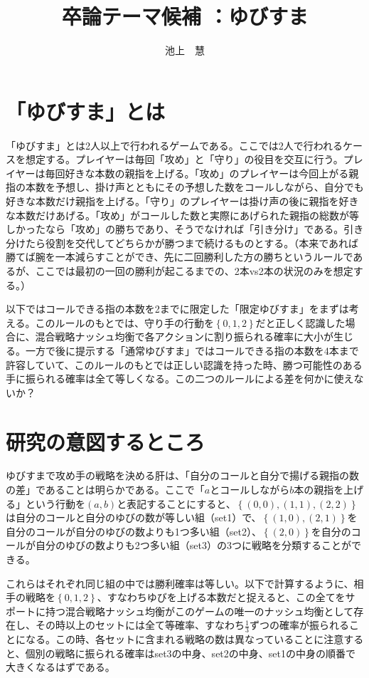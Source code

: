 \documentclass{jsarticle}
\begin{document}
\title{卒論テーマ候補 ：ゆびすま}
\author{池上　慧}
\maketitle

\section{「ゆびすま」とは}
「ゆびすま」とは2人以上で行われるゲームである。ここでは2人で行われるケースを想定する。プレイヤーは毎回「攻め」と「守り」の役目を交互に行う。プレイヤーは毎回好きな本数の親指を上げる。「攻め」のプレイヤーは今回上がる親指の本数を予想し、掛け声とともにその予想した数をコールしながら、自分でも好きな本数だけ親指を上げる。「守り」のプレイヤーは掛け声の後に親指を好きな本数だけあげる。「攻め」がコールした数と実際にあげられた親指の総数が等しかったなら「攻め」の勝ちであり、そうでなければ「引き分け」である。引き分けたら役割を交代してどちらかが勝つまで続けるものとする。（本来であれば勝てば腕を一本減らすことができ、先に二回勝利した方の勝ちというルールであるが、ここでは最初の一回の勝利が起こるまでの、2本vs2本の状況のみを想定する。）

以下ではコールできる指の本数を2までに限定した「限定ゆびすま」をまずは考える。このルールのもとでは、守り手の行動を$\left\{ 0,1,2 \right\}$だと正しく認識した場合に、混合戦略ナッシュ均衡で各アクションに割り振られる確率に大小が生じる。一方で後に提示する「通常ゆびすま」ではコールできる指の本数を4本まで許容していて、このルールのもとでは正しい認識を持った時、勝つ可能性のある手に振られる確率は全て等しくなる。この二つのルールによる差を何かに使えないか？

\section{研究の意図するところ}
ゆびすまで攻め手の戦略を決める肝は、「自分のコールと自分で揚げる親指の数の差」であることは明らかである。ここで「$a$とコールしながら$b$本の親指を上げる」という行動を$(a,b)$と表記することにすると、$\left\{ (0,0), (1,1), (2,2)\right\}$は自分のコールと自分のゆびの数が等しい組（set1）で、$\left\{ (1,0), (2,1)\right\}$を自分のコールが自分のゆびの数よりも1つ多い組（set2）、$\left\{ (2,0)\right\}$を自分のコールが自分のゆびの数よりも2つ多い組（set3）の3つに戦略を分類することができる。

これらはそれぞれ同じ組の中では勝利確率は等しい。以下で計算するように、相手の戦略を$\left\{ 0,1,2\right\}$、すなわちゆびを上げる本数だと捉えると、この全てをサポートに持つ混合戦略ナッシュ均衡がこのゲームの唯一のナッシュ均衡として存在し、その時以上のセットには全て等確率、すなわち$\frac{1}{3}$ずつの確率が振られることになる。この時、各セットに含まれる戦略の数は異なっていることに注意すると、個別の戦略に振られる確率はset3の中身、set2の中身、set1の中身の順番で大きくなるはずである。
\end{document}
